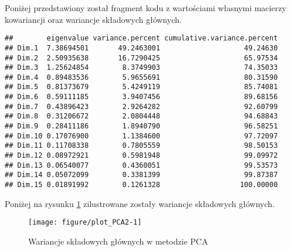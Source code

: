 \documentclass[12pt, a4paper]{article}\usepackage[]{graphicx}\usepackage[]{xcolor}
\makeatletter
\def\maxwidth{ %
  \ifdim\Gin@nat@width>\linewidth
    \linewidth
  \else
    \Gin@nat@width
  \fi
}
\newenvironment{kframe}{%
 \def\at@end@of@kframe{}%
 \ifinner\ifhmode%
  \def\at@end@of@kframe{\end{minipage}}%
  \begin{minipage}{\columnwidth}%
 \fi\fi%
 \def\FrameCommand##1{\hskip\@totalleftmargin \hskip-\fboxsep
 \colorbox{shadecolor}{##1}\hskip-\fboxsep
     \hskip-\linewidth \hskip-\@totalleftmargin \hskip\columnwidth}%
 \MakeFramed {\advance\hsize-\width
   \@totalleftmargin\z@ \linewidth\hsize
   \@setminipage}}%
 {\par\unskip\endMakeFramed%
 \at@end@of@kframe}
\newenvironment{knitrout}{}{} %
\makeatother
\begin{document}
Poniżej przedstawiony został fragment kodu z wartościami własnymi macierzy kowariancji oraz wariancje składowych głównych.

\begin{knitrout}
\color{fgcolor}\begin{kframe}
\begin{verbatim}
##        eigenvalue variance.percent cumulative.variance.percent
## Dim.1  7.38694501       49.2463001                    49.24630
## Dim.2  2.50935638       16.7290425                    65.97534
## Dim.3  1.25624854        8.3749903                    74.35033
## Dim.4  0.89483536        5.9655691                    80.31590
## Dim.5  0.81373679        5.4249119                    85.74081
## Dim.6  0.59111185        3.9407456                    89.68156
## Dim.7  0.43896423        2.9264282                    92.60799
## Dim.8  0.31206672        2.0804448                    94.68843
## Dim.9  0.28411186        1.8940790                    96.58251
## Dim.10 0.17076900        1.1384600                    97.72097
## Dim.11 0.11708338        0.7805559                    98.50153
## Dim.12 0.08972921        0.5981948                    99.09972
## Dim.13 0.06540077        0.4360051                    99.53573
## Dim.14 0.05072099        0.3381399                    99.87387
## Dim.15 0.01891992        0.1261328                   100.00000
\end{verbatim}
\end{kframe}
\end{knitrout}

Poniżej na rysunku \ref{fig:plot_PCA2} zilustrowane zostały wariancje składowych głównych.

\begin{knitrout}
\color{fgcolor}\begin{figure}[H]

{\centering \texttt{[image: figure/plot\_PCA2-1]} 

}

\caption[Wariancje składowych głównych w metodzie PCA]{Wariancje składowych głównych w metodzie PCA}\label{fig:plot_PCA2}
\end{figure}

\end{knitrout}
\end{document}
